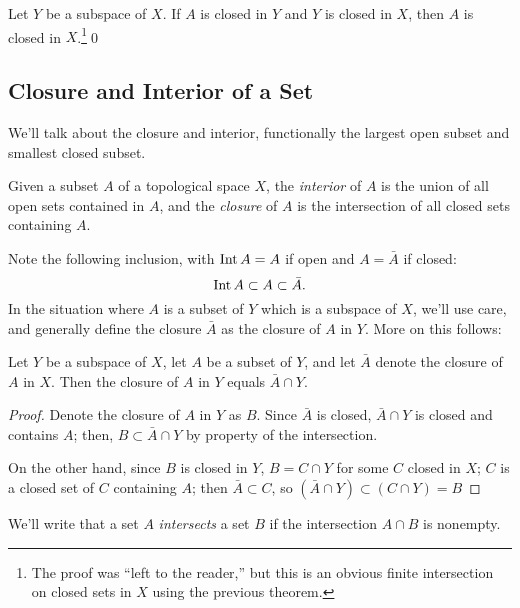 \documentclass[10pt]{report}
\begin{document}
\begin{theorem}
  Let $Y$ be a subspace of $X$.
  If $A$ is closed in $Y$ and $Y$ is closed in $X$, then $A$ is closed in $X$.\footnote{The proof was ``left to the reader,'' but this is an obvious finite intersection on closed sets in $X$ using the previous theorem.}\qed
\end{theorem}

\subsection{Closure and Interior of a Set}
We'll talk about the closure and interior, functionally the largest open subset and smallest closed subset.
\begin{definition}
  Given a subset $A$ of a topological space $X$, the \emph{interior} of $A$ is the union of all open sets contained in $A$, and the \emph{closure} of $A$ is the intersection of all closed sets containing $A$.
\end{definition}

Note the following inclusion, with $\text{Int} \, A = A$ if open and $A = \bar A$ if closed:
\[
  \text{Int} \, A \subset A \subset \bar A.
\]
In the situation where $A$ is a subset of $Y$ which is a subspace of $X$, we'll use care, and generally define the closure $\bar A$ as the closure of $A$ in $Y$.
More on this follows:

\begin{theorem}
  Let $Y$ be a subspace of $X$,
  let $A$ be a subset of $Y$,
  and let $\bar A$ denote the closure of $A$ in $X$.
  Then the closure of $A$ in $Y$ equals $\bar A \cap Y$.
\end{theorem}
\begin{proof}
  Denote the closure of $A$ in $Y$ as $B$.
  Since $\bar{A}$ is closed, $\bar{A} \cap Y$ is closed and contains $A$;
  then, $B \subset \bar A \cap Y$ by property of the intersection.

  On the other hand, since $B$ is closed in $Y$, $B = C \cap Y$ for some $C$ closed in $X$;
  $C$ is a closed set of $C$ containing $A$;
  then $\bar{A} \subset C$, so $(\bar A \cap Y) \subset (C \cap Y) = B$
\end{proof}

We'll write that a set $A$ \emph{intersects} a set $B$ if the intersection $A \cap B$ is nonempty.
\end{document}
